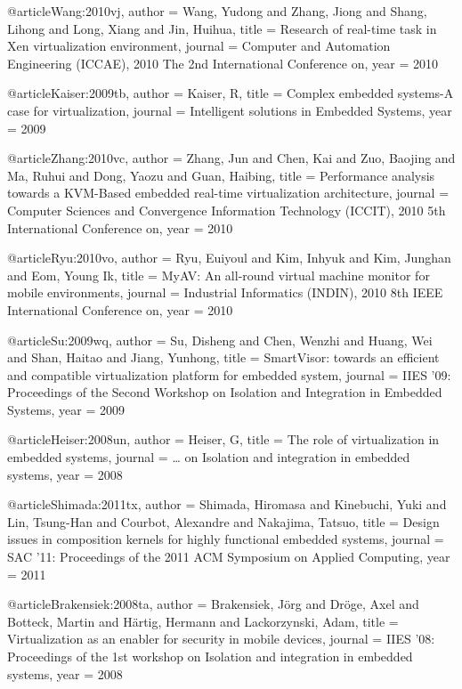 @article{Wang:2010vj,
author = {Wang, Yudong and Zhang, Jiong and Shang, Lihong and Long, Xiang and Jin, Huihua},
title = {{Research of real-time task in Xen virtualization environment}},
journal = {Computer and Automation Engineering (ICCAE), 2010 The 2nd International Conference on},
year = {2010}
}

@article{Kaiser:2009tb,
author = {Kaiser, R},
title = {{Complex embedded systems-A case for virtualization}},
journal = {Intelligent solutions in Embedded Systems},
year = {2009}
}

@article{Zhang:2010vc,
author = {Zhang, Jun and Chen, Kai and Zuo, Baojing and Ma, Ruhui and Dong, Yaozu and Guan, Haibing},
title = {{Performance analysis towards a KVM-Based embedded real-time virtualization architecture}},
journal = {Computer Sciences and Convergence Information Technology (ICCIT), 2010 5th International Conference on},
year = {2010}
}

@article{Ryu:2010vo,
author = {Ryu, Euiyoul and Kim, Inhyuk and Kim, Junghan and Eom, Young Ik},
title = {{MyAV: An all-round virtual machine monitor for mobile environments}},
journal = {Industrial Informatics (INDIN), 2010 8th IEEE International Conference on},
year = {2010}
}

@article{Su:2009wq,
author = {Su, Disheng and Chen, Wenzhi and Huang, Wei and Shan, Haitao and Jiang, Yunhong},
title = {{SmartVisor: towards an efficient and compatible virtualization platform for embedded system}},
journal = {IIES '09: Proceedings of the Second Workshop on Isolation and Integration in Embedded Systems},
year = {2009}
}

@article{Heiser:2008un,
author = {Heiser, G},
title = {{The role of virtualization in embedded systems}},
journal = {{\ldots} on Isolation and integration in embedded systems},
year = {2008}
}

@article{Shimada:2011tx,
author = {Shimada, Hiromasa and Kinebuchi, Yuki and Lin, Tsung-Han and Courbot, Alexandre and Nakajima, Tatsuo},
title = {{Design issues in composition kernels for highly functional embedded systems}},
journal = {SAC '11: Proceedings of the 2011 ACM Symposium on Applied Computing},
year = {2011}
}

@article{Brakensiek:2008ta,
author = {Brakensiek, J{\"o}rg and Dr{\"o}ge, Axel and Botteck, Martin and H{\"a}rtig, Hermann and Lackorzynski, Adam},
title = {{Virtualization as an enabler for security in mobile devices}},
journal = {IIES '08: Proceedings of the 1st workshop on Isolation and integration in embedded systems},
year = {2008}
}

